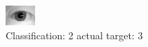\begin{figure}[h!]
\begin{center}
\includegraphics[width=0.60\columnwidth]{figures/ID1147_class_2_target_3.png}
\end{center}
\caption{ Classification: 2 actual target: 3}
\label{fig:ID1147_class_2_target_3}
\end{figure}

